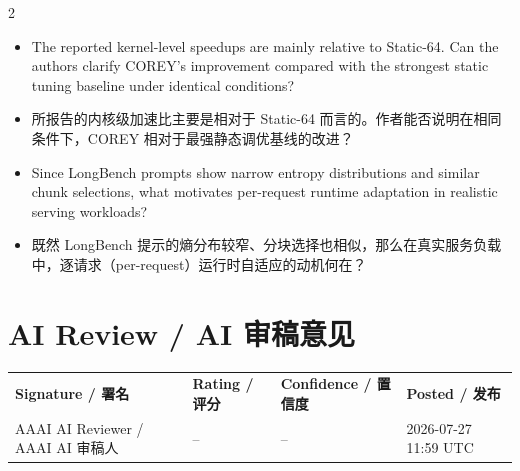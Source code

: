 \documentclass[10pt,a4paper]{article}
\makeatletter
\newcommand{\Pair}[2]{#1\par\switchcolumn #2\par\switchcolumn*}
\newcommand{\PItem}[3]{\Pair{\begin{itemize}[label={#1}]\item #2\end{itemize}}%
                            {\begin{itemize}[label={#1}]\item #3\end{itemize}}}
\newcommand{\ReviewMeta}[4]{%
  \begin{infobox}
  \begin{tabularx}{\linewidth}{@{}X l l l@{}}
  \textbf{Signature / 署名} & \textbf{Rating / 评分} & \textbf{Confidence / 置信度} & \textbf{Posted / 发布} \\
  #1 & #2 & #3 & #4
  \end{tabularx}
  \end{infobox}}
\makeatother
\begin{document}
\begin{paracol}{2}
\PItem{Q4.}{The reported kernel-level speedups are mainly relative to Static-64. Can
the authors clarify COREY's improvement compared with the strongest static tuning
baseline under identical conditions?}
{所报告的内核级加速比主要是相对于 Static-64 而言的。作者能否说明在相同条件下，COREY 相对于最强静态调优基线的改进？}

\PItem{Q5.}{Since LongBench prompts show narrow entropy distributions and similar
chunk selections, what motivates per-request runtime adaptation in realistic serving
workloads?}
{既然 LongBench 提示的熵分布较窄、分块选择也相似，那么在真实服务负载中，逐请求（per-request）运行时自适应的动机何在？}
\end{paracol}

\section{AI Review / AI 审稿意见}

\ReviewMeta{AAAI AI Reviewer / AAAI AI 审稿人}{--}{--}{2026-07-27 11:59 UTC}
\end{document}
